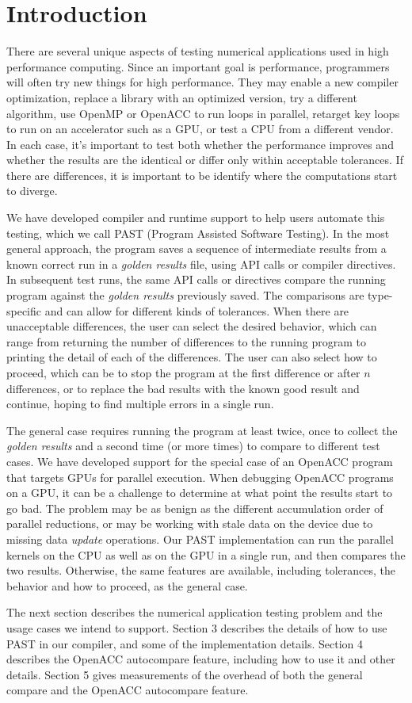\section{Introduction}

There are several unique aspects of testing numerical applications used in high performance computing.
Since an important goal is performance, programmers will often try new things for high performance.
They may enable a new compiler optimization, replace a library with an optimized version, try a different algorithm, use OpenMP or OpenACC to run loops in parallel, retarget key loops to run on an accelerator such as a GPU, or test a CPU from a different vendor.
In each case, it's important to test both whether the performance improves and whether the results are the identical or differ only within acceptable tolerances.
If there are differences, it is important to be identify where the computations start to diverge.

We have developed compiler and runtime support to help users automate this testing, which we call PAST (Program Assisted Software Testing).
In the most general approach, the program saves a sequence of intermediate results from a known correct run in a \emph{golden results} file, using API calls or compiler directives.
In subsequent test runs, the same API calls or directives compare the running program against the \emph{golden results} previously saved.
The comparisons are type-specific and can allow for different kinds of tolerances.
When there are unacceptable differences, the user can select the desired behavior, which can range from returning the number of differences to the running program to printing the detail of each of the differences.
The user can also select how to proceed, which can be to stop the program at the first difference or after $n$ differences, or to replace the bad results with the known good result and continue, hoping to find multiple errors in a single run.

The general case requires running the program at least twice, once to collect the \emph{golden results} and a second time (or more times) to compare to different test cases.
We have developed support for the special case of an OpenACC program that targets GPUs for parallel execution.
When debugging OpenACC programs on a GPU, it can be a challenge to determine at what point the results start to go bad.
The problem may be as benign as the different accumulation order of parallel reductions, or may be working with stale data on the device due to missing data \emph{update} operations.
Our PAST implementation can run the parallel kernels on the CPU as well as on the GPU in a single run, and then compares the two results.
Otherwise, the same features are available, including tolerances, the behavior and how to proceed, as the general case.

The next section describes the numerical application testing problem and the usage cases we intend to support.
Section 3 describes the details of how to use PAST in our compiler, and some of the implementation details.
Section 4 describes the OpenACC autocompare feature, including how to use it and other details.
Section 5 gives measurements of the overhead of both the general compare and the OpenACC autocompare feature.

